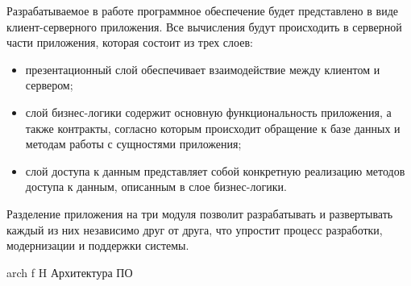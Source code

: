 Разрабатываемое в работе программное обеспечение будет представлено в виде клиент-серверного приложения. Все вычисления будут происходить в серверной части приложения, которая состоит из трех слоев:

\begin{itemize}[label=---]
    \item презентационный слой обеспечивает взаимодействие между клиентом и сервером;
    \item слой бизнес-логики содержит основную функциональность приложения, а также контракты, согласно которым происходит обращение к базе данных и методам работы с сущностями приложения;
    \item слой доступа к данным представляет собой конкретную реализацию методов доступа к данным, описанным в слое бизнес-логики.
\end{itemize}
Разделение приложения на три модуля позволит разрабатывать и развертывать каждый из них независимо друг от друга, что упростит процесс разработки, модернизации и поддержки системы.

    {arch}
    {f}
    {H}
    {\linewidth}
    {Архитектура ПО}

